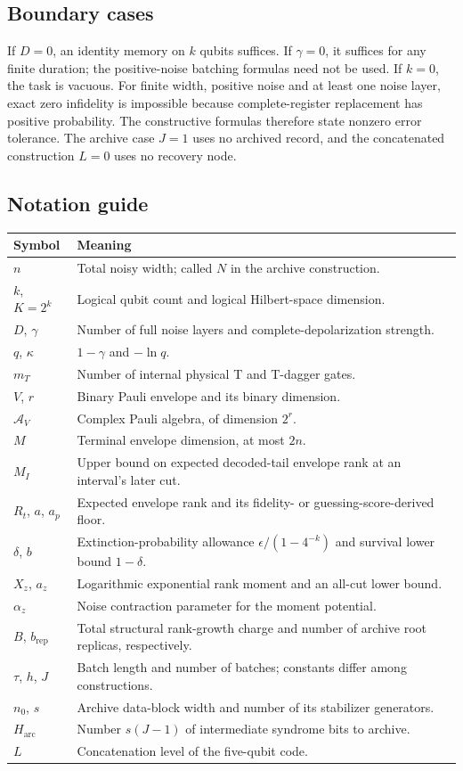 \documentclass[11pt,a4paper]{article}
\numberwithin{equation}{section}
\theoremstyle{remark}\newtheorem*{remark}{Interpretation}
\newcommand{\A}{\mathcal A}
\newcommand{\eps}{\epsilon}
\begin{document}
\subsection{Boundary cases}
If $D=0$, an identity memory on $k$ qubits suffices. If $\gamma=0$, it suffices for any finite duration; the positive-noise batching formulas need not be used. If $k=0$, the task is vacuous. For finite width, positive noise and at least one noise layer, exact zero infidelity is impossible because complete-register replacement has positive probability. The constructive formulas therefore state nonzero error tolerance. The archive case $J=1$ uses no archived record, and the concatenated construction $L=0$ uses no recovery node.

\subsection{Notation guide}
\begin{tabularx}{\linewidth}{@{}p{25mm}X@{}}
\toprule
Symbol & Meaning\\
\midrule
$n$ & Total noisy width; called $N$ in the archive construction.\\
$k$, $K=2^k$ & Logical qubit count and logical Hilbert-space dimension.\\
$D$, $\gamma$ & Number of full noise layers and complete-depolarization strength.\\
$q$, $\kappa$ & $1-\gamma$ and $-\ln q$.\\
$m_T$ & Number of internal physical T and T-dagger gates.\\
$V$, $r$ & Binary Pauli envelope and its binary dimension.\\
$\A_V$ & Complex Pauli algebra, of dimension $2^r$.\\
$M$ & Terminal envelope dimension, at most $2n$.\\
$M_I$ & Upper bound on expected decoded-tail envelope rank at an interval's later cut.\\
$R_t$, $a$, $a_p$ & Expected envelope rank and its fidelity- or guessing-score-derived floor.\\
$\delta$, $b$ & Extinction-probability allowance $\eps/(1-4^{-k})$ and survival lower bound $1-\delta$.\\
$X_z$, $a_z$ & Logarithmic exponential rank moment and an all-cut lower bound.\\
$\alpha_z$ & Noise contraction parameter for the moment potential.\\
$B$, $b_{\mathrm{rep}}$ & Total structural rank-growth charge and number of archive root replicas, respectively.\\
$\tau$, $h$, $J$ & Batch length and number of batches; constants differ among constructions.\\
$n_0$, $s$ & Archive data-block width and number of its stabilizer generators.\\
$H_{\mathrm{arc}}$ & Number $s(J-1)$ of intermediate syndrome bits to archive.\\
$L$ & Concatenation level of the five-qubit code.\\
\bottomrule
\end{tabularx}
\end{document}
